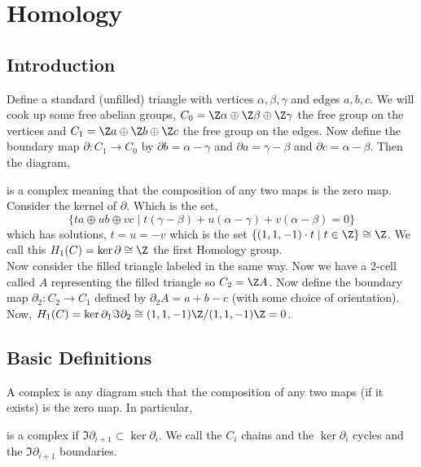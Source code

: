 \documentclass[12pt]{extarticle}
\begin{document}
\section{Homology}


\subsection{Introduction}

Define a standard (unfilled) triangle with vertices $\alpha, \beta, \gamma$ and edges $a,b,c$. We will cook up some free abelian groups, $C_0 = \Z \alpha \oplus \Z \beta \oplus \Z \gamma$ the free group on the vertices and $C_1 = \Z a \oplus \Z b \oplus \Z c$ the free group on the edges. Now define the boundary map $\partial : C_1 \to C_0$ by $\partial b = \alpha - \gamma$ and $\partial a = \gamma - \beta$ and $\partial c = \alpha - \beta$. Then the diagram,
\begin{center}
\end{center}
is a complex meaning that the composition of any two maps is the zero map. Consider the kernel of $\partial$. Which is the set,
\[ \{ t a \oplus ub \oplus vc  \mid t(\gamma - \beta) + u(\alpha - \gamma) + v(\alpha - \beta) = 0 \} \]
which has solutions, $t = u = - v$ which is the set $\{ (1, 1, -1) \cdot t \mid t \in \Z\} \cong \Z$. We call this $H_1(C) = \ker{\partial} \cong \Z$ the first Homology group. \bigskip\\
Now consider the filled triangle labeled in the same way. Now we have a 2-cell called $A$ representing the filled triangle so $C_2 = \Z A$. Now define the boundary map $\partial_2 : C_2 \to C_1$ defined by $\partial_2 A = a + b - c$ (with some choice of orientation). Now, $H_1(C) = \ker{\partial_1}{\Im{\partial_2}} \cong (1, 1, -1) \Z / (1,1,-1)\Z = 0$.   

\subsection{Basic Definitions}

\begin{definition}
A complex is any diagram such that the composition of any two maps (if it exists) is the zero map. In particular,
\begin{center}
\end{center}
is a complex if $\Im{\partial_{i+1}} \subset \ker{\partial_i}$. We call the $C_i$ chains and the $\ker{\partial_i}$ cycles and the $\Im{\partial_{i+1}}$ boundaries. 
\end{definition} 
\end{document}
